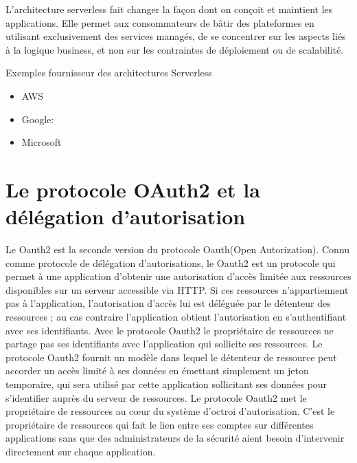 L’architecture serverless fait changer la façon dont on conçoit et maintient les applications. Elle permet aux consommateurs de bâtir des plateformes en utilisant exclusivement des services managés, de se concentrer sur les aspects liés à la logique business, et non sur les contraintes de déploiement ou de scalabilité.
\begin{list}{•}
	\item  Exemples fournisseur des architectures Serverless
	\begin{itemize}
		\item AWS
		\item Google:
		\item Microsoft
	\end{itemize}

\end{list}



\section{Le protocole OAuth2 et la délégation d’autorisation}

Le Oauth2 est la seconde version du protocole Oauth(Open Autorization). Connu comme protocole de
délégation d’autorisations, le Oauth2 est un protocole qui permet à une application d’obtenir une autorisation d’accès limitée aux ressources disponibles sur un serveur accessible via HTTP. Si ces ressources
n’appartiennent pas à l’application, l’autorisation d’accès lui est déléguée par le détenteur des ressources ;
au cas contraire l’application obtient l’autorisation en s’authentifiant avec ses identifiants. Avec le protocole Oauth2 le propriétaire de ressources ne partage pas ses identifiants avec l’application qui sollicite ses
ressources. Le protocole Oauth2 fournit un modèle dans lequel le détenteur de ressource peut accorder un
accès limité à ses données en émettant simplement un jeton temporaire, qui sera utilisé par cette application
sollicitant ses données pour s’identifier auprès du serveur de ressources. Le protocole Oauth2 met le propriétaire de ressources au cœur du système d’octroi d’autorisation. C’est le propriétaire de ressources qui
fait le lien entre ses comptes sur différentes applications sans que des administrateurs de la sécurité aient
besoin d’intervenir directement sur chaque application.

